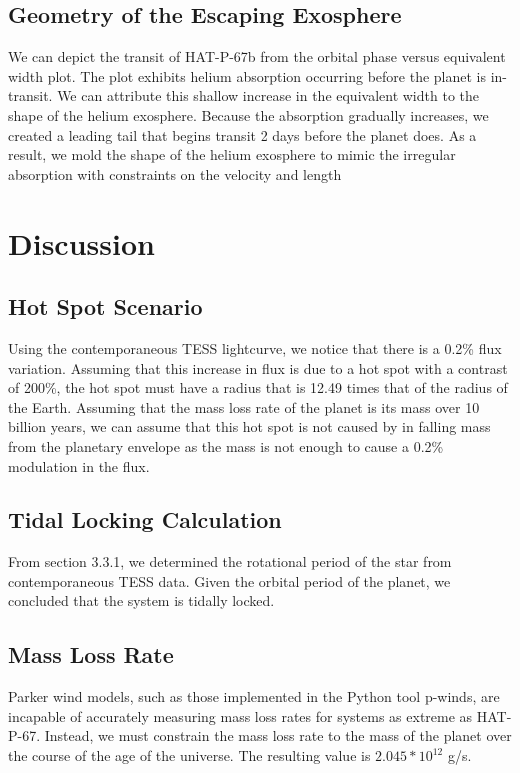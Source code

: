 \documentclass[twocolumn]{aastex631}
\begin{document}
\subsection{Geometry of the Escaping Exosphere}
We can depict the transit of HAT-P-67b from the orbital phase versus equivalent width plot. The plot exhibits helium absorption occurring before the planet is in-transit. We can attribute this shallow increase in the equivalent width to the shape of the helium exosphere. Because the absorption gradually increases, we created a leading tail that begins transit 2 days before the planet does. As a result, we mold the shape of the helium exosphere to mimic the irregular absorption with constraints on the velocity and length

\section{Discussion}
\subsection{Hot Spot Scenario}
Using the contemporaneous TESS lightcurve, we notice that there is a 0.2\% flux variation. Assuming that this increase in flux is due to a hot spot with a contrast of 200\%, the hot spot must have a radius that is 12.49 times that of the radius of the Earth. Assuming that the mass loss rate of the planet is its mass over 10 billion years, we can assume that this hot spot is not caused by in falling mass from the planetary envelope as the mass is not enough to cause a 0.2\% modulation in the flux.

\subsection{Tidal Locking Calculation}
From section 3.3.1, we determined the rotational period of the star from contemporaneous TESS data. Given the orbital period of the planet, we concluded that the system is tidally locked.

\subsection{Mass Loss Rate}
Parker wind models, such as those implemented in the Python tool p-winds, are incapable of accurately measuring mass loss rates for systems as extreme as HAT-P-67. Instead, we must constrain the mass loss rate to the mass of the planet over the course of the age of the universe. The resulting value is $2.045*10^{12}$ g/s.
\end{document}
